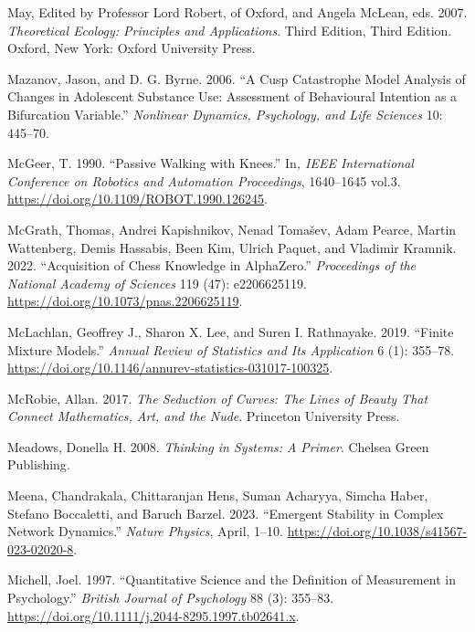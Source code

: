 \documentclass[
  a4paper,
  DIV=11,
  numbers=noendperiod,
  oneside]{scrreprt}
\newlength{\cslhangindent}
\newenvironment{CSLReferences}[2] %
 {\begin{list}{}{%
  \setlength{\itemindent}{0pt}
  \setlength{\leftmargin}{0pt}
  \setlength{\parsep}{0pt}
  \ifodd #1
   \setlength{\leftmargin}{\cslhangindent}
   \setlength{\itemindent}{-1\cslhangindent}
  \fi
  \setlength{\itemsep}{#2\baselineskip}}}
 {\end{list}}
\begin{document}
\begin{CSLReferences}{1}{0}
May, Edited by Professor Lord Robert, of Oxford, and Angela McLean, eds.
2007. \emph{Theoretical {Ecology}: {Principles} and {Applications}}.
Third Edition, Third Edition. {Oxford, New York}: {Oxford University
Press}.

Mazanov, Jason, and D. G. Byrne. 2006. {``A {Cusp Catastrophe Model
Analysis} of {Changes} in {Adolescent Substance Use}: {Assessment} of
{Behavioural Intention} as a {Bifurcation Variable}.''} \emph{Nonlinear
Dynamics, Psychology, and Life Sciences} 10: 445--70.

McGeer, T. 1990. {``Passive Walking with Knees.''} In\emph{, {IEEE
International Conference} on {Robotics} and {Automation Proceedings}},
1640--1645 vol.3. \url{https://doi.org/10.1109/ROBOT.1990.126245}.

McGrath, Thomas, Andrei Kapishnikov, Nenad Tomašev, Adam Pearce, Martin
Wattenberg, Demis Hassabis, Been Kim, Ulrich Paquet, and Vladimir
Kramnik. 2022. {``Acquisition of Chess Knowledge in {AlphaZero}.''}
\emph{Proceedings of the National Academy of Sciences} 119 (47):
e2206625119. \url{https://doi.org/10.1073/pnas.2206625119}.

McLachlan, Geoffrey J., Sharon X. Lee, and Suren I. Rathnayake. 2019.
{``Finite {Mixture Models}.''} \emph{Annual Review of Statistics and Its
Application} 6 (1): 355--78.
\url{https://doi.org/10.1146/annurev-statistics-031017-100325}.

McRobie, Allan. 2017. \emph{The {Seduction} of {Curves}: {The Lines} of
{Beauty That Connect Mathematics}, {Art}, and the {Nude}}. {Princeton
University Press}.

Meadows, Donella H. 2008. \emph{Thinking in {Systems}: {A Primer}}.
{Chelsea Green Publishing}.

Meena, Chandrakala, Chittaranjan Hens, Suman Acharyya, Simcha Haber,
Stefano Boccaletti, and Baruch Barzel. 2023. {``Emergent Stability in
Complex Network Dynamics.''} \emph{Nature Physics}, April, 1--10.
\url{https://doi.org/10.1038/s41567-023-02020-8}.

Michell, Joel. 1997. {``Quantitative Science and the Definition of
Measurement in Psychology.''} \emph{British Journal of Psychology} 88
(3): 355--83. \url{https://doi.org/10.1111/j.2044-8295.1997.tb02641.x}.


\end{CSLReferences}
\end{document}
